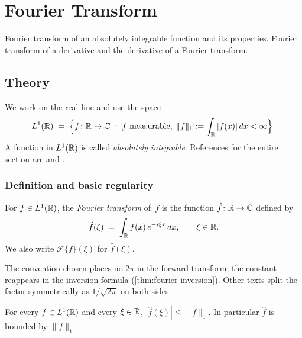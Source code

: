
\section{Fourier Transform}
\label{sec:1.1.13-fourier-transform}

\begin{ticket}
Fourier transform of an absolutely integrable function and its properties. Fourier transform of a derivative and the derivative of a Fourier transform.
\end{ticket}

\subsection*{Theory}

We work on the real line and use the space
\[
  L^1(\mathbb{R}) \;=\; \Bigl\{ f \colon \mathbb{R} \to \mathbb{C} \;:\; f \text{ measurable},\; \|f\|_1 := \int_{\mathbb{R}} |f(x)|\, dx < \infty \Bigr\}.
\]
A function in $L^1(\mathbb{R})$ is called \emph{absolutely integrable}.
References for the entire section are
\cite[Vol.~II, Ch.~XVIII, \S~3]{Zorich1981} and
\cite[Ch.~VIII]{KolmogorovFomin}.

\subsubsection*{Definition and basic regularity}

\begin{definition}
\label{def:fourier-transform}
For $f \in L^1(\mathbb{R})$, the \emph{Fourier transform} of~$f$ is the
function $\hat f \colon \mathbb{R} \to \mathbb{C}$ defined by
\[
  \hat f(\xi) \;=\; \int_{\mathbb{R}} f(x)\, e^{-i \xi x}\, dx, \qquad \xi \in \mathbb{R}.
\]
We also write $\mathcal{F}\{f\}(\xi)$ for $\hat f(\xi)$.
\end{definition}

\begin{remark}
The convention chosen places no $2\pi$ in the forward transform; the
constant reappears in the inversion formula
(\cref{thm:fourier-inversion}). Other texts split the factor
symmetrically as $1/\sqrt{2\pi}$ on both sides.
\end{remark}

\begin{proposition}[Boundedness]
\label{prop:ft-bounded}
For every $f \in L^1(\mathbb{R})$ and every $\xi \in \mathbb{R}$,
$|\hat f(\xi)| \leq \|f\|_1$. In particular $\hat f$ is bounded by
$\|f\|_1$.
\end{proposition}

